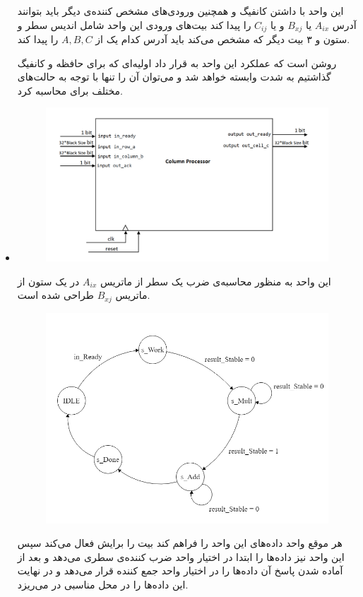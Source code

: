 \documentclass[12pt,onecolumn,a4paper,fleqn]{article}
\begin{document}
\begin{itemize}
	این واحد با داشتن کانفیگ و همچنین ورودی‌های مشخص کننده‌ی دیگر باید بتوانند آدرس $A_{ix}$ یا $B_{xj}$ و یا $C_{ij}$ را پیدا کند بیت‌های ورودی این واحد شامل اندیس سطر و ستون و ۳ بیت دیگر که مشخص می‌کند باید آدرس کدام یک از $A,B,C$ را پیدا کند. 
	
	روشن است که عملکرد این واحد به قرار داد اولیه‌ای که برای حافظه و کانفیگ گذاشتیم به شدت وابسته خواهد شد و می‌توان آن را تنها با توجه به حالت‌های مختلف برای  محاسبه کرد.
	
	\pagebreak
	
	\item {}
	
\begin{figure}[h]
	\centering
	\includegraphics[width=0.7\linewidth]{source/columnProcessor.png}
	\caption{}
\end{figure}
	
	این واحد به منظور محاسبه‌ی ضرب یک سطر از ماتریس $A_{ix}$ در یک ستون از ماتریس $B_{xj}$ طراحی شده است. 


	\begin{figure}[h]
		\centering
		\includegraphics[width=0.6\linewidth]{source/column_procsessor.png}
		\caption{}
	\end{figure}

هر موقع واحد  داده‌های این واحد را فراهم کند بیت  را برایش فعال می‌کند سپس این واحد نیز داده‌ها را ابتدا در اختیار واحد ضرب کننده‌ی سطری می‌دهد و بعد از آماده شدن پاسخ آن داده‌ها را در اختیار واحد جمع کننده قرار می‌دهد و در نهایت این داده‌ها را در محل مناسبی در  می‌ریزد.


\end{itemize}
\end{document}
